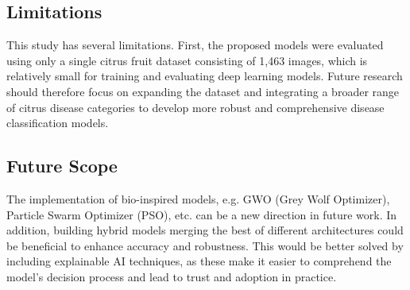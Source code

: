 \documentclass{ijcaArticle}
\begin{document}
\subsection{Limitations}
This study has several limitations. First, the proposed models were evaluated using only a single citrus fruit dataset consisting of 1,463 images, which is relatively small for training and evaluating deep learning models. Future research should therefore focus on expanding the dataset and integrating a broader range of citrus disease categories to develop more robust and comprehensive disease classification models.

\subsection{Future Scope}
The implementation of bio-inspired models, e.g. GWO (Grey Wolf Optimizer), Particle Swarm Optimizer (PSO), etc. can be a new direction in future work. In addition, building hybrid models merging the best of different architectures could be beneficial to enhance accuracy and robustness. This would be better solved by including explainable AI techniques, as these make it easier to comprehend the model's decision process and lead to trust and adoption in practice.



\end{document}
